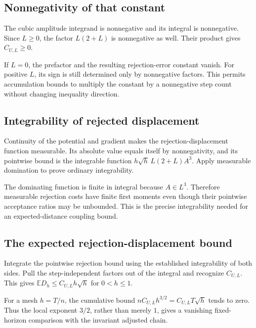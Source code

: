 \documentclass[11pt,a4paper]{article}
\begin{document}
\subsection{\texorpdfstring{Nonnegativity of that constant}{Nonnegativity of that constant}}


The cubic amplitude integrand is nonnegative and its integral is nonnegative. Since \(L\ge0\), the factor \(L(2+L)\) is nonnegative as well. Their product gives \(C_{U,L}\ge0\).



If \(L=0\), the prefactor and the resulting rejection-error constant vanish. For positive \(L\), its sign is still determined only by nonnegative factors. This permits accumulation bounds to multiply the constant by a nonnegative step count without changing inequality direction.


\subsection{\texorpdfstring{Integrability of rejected displacement}{Integrability of rejected displacement}}


Continuity of the potential and gradient makes the rejection-displacement function measurable. Its absolute value equals itself by nonnegativity, and its pointwise bound is the integrable function \(h\sqrt h\,L(2+L)A^3\). Apply measurable domination to prove ordinary integrability.



The dominating function is finite in integral because \(A\in L^3\). Therefore measurable rejection costs have finite first moments even though their pointwise acceptance ratios may be unbounded. This is the precise integrability needed for an expected-distance coupling bound.


\subsection{\texorpdfstring{The expected rejection-displacement bound}{The expected rejection-displacement bound}}


Integrate the pointwise rejection bound using the established integrability of both sides. Pull the step-independent factors out of the integral and recognize \(C_{U,L}\). This gives \(\mathbb ED_h\le C_{U,L}h\sqrt h\) for \(0<h\le1\).



For a mesh \(h=T/n\), the cumulative bound \(n C_{U,L}h^{3/2}=C_{U,L}T\sqrt h\) tends to zero. Thus the local exponent \(3/2\), rather than merely \(1\), gives a vanishing fixed-horizon comparison with the invariant adjusted chain.
\end{document}
